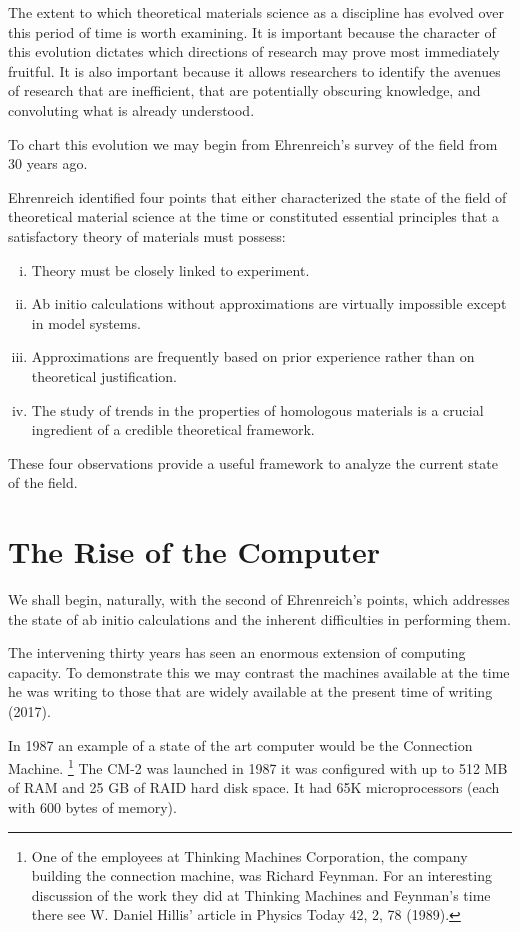 The extent to which theoretical materials science as a discipline has evolved 
over this period of time is worth examining. 
It is important because the character of this evolution dictates which 
directions of research may prove most immediately fruitful. It is also important 
because it allows researchers to identify the avenues
of research that are inefficient, that are potentially obscuring knowledge, 
and convoluting what is already understood. 

To chart this evolution we may begin from Ehrenreich's survey of the field from 30 years ago.

Ehrenreich identified four points that either characterized the state 
of the field of theoretical material science at the time or constituted essential principles 
that a satisfactory theory of materials must possess:
%
\begin{enumerate}[i)]
\item Theory must be closely linked to experiment.
\item Ab initio calculations without approximations are virtually impossible 
      except in model systems.
\item Approximations are frequently based on prior experience rather 
      than on theoretical justification.
\item The study of trends in the properties of homologous materials 
      is a crucial ingredient of a credible theoretical framework.
\end{enumerate}
%
These four observations provide a useful framework to analyze the current state of the field.

\section{The Rise of the Computer}
\label{sec:riseofcomp}
We shall begin, naturally, with the second of Ehrenreich's points, 
which addresses the state of ab initio calculations
and the inherent difficulties in performing them. 

The intervening thirty years has seen an enormous extension of computing capacity. 
To demonstrate this we may contrast the machines available at the time
he was writing to those that are widely available at the present time of writing (2017). 

In 1987 an example of a state of the art computer would be the Connection Machine.
\footnote{One of the employees at Thinking Machines Corporation,
the company building the connection machine, was Richard Feynman.
For an interesting discussion of the work they
did at Thinking Machines and Feynman's time there see W. Daniel
Hillis' article in Physics Today 42, 2, 78 (1989).}
The CM-2 was launched in 1987 it was configured with up to 512 MB of RAM and 25 GB of RAID
hard disk space. It had 65K microprocessors (each with 600 bytes of memory). 

